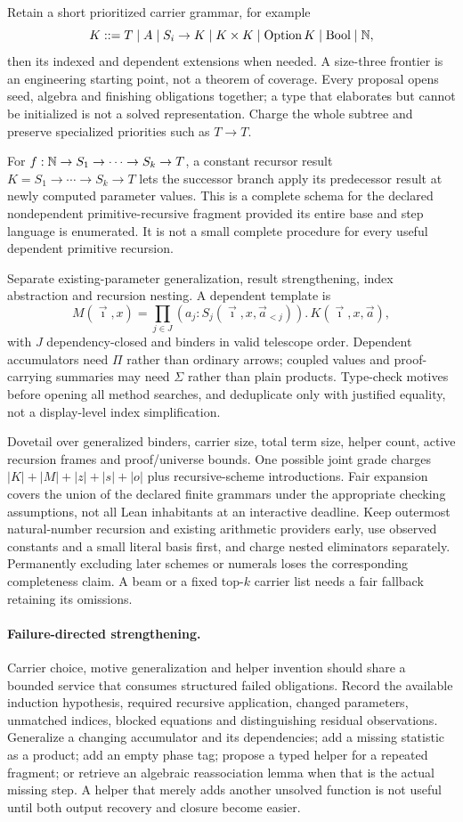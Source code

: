 Retain a short prioritized carrier grammar, for example
\[
 K::=T\mid A\mid S_i\to K\mid K\times K\mid\mathrm{Option}\,K
       \mid\mathrm{Bool}\mid\mathbb{N},
\]
then its indexed and dependent extensions when needed. A size-three frontier
is an engineering starting point, not a theorem of coverage. Every proposal
opens seed, algebra and finishing obligations together; a type that elaborates
but cannot be initialized is not a solved representation. Charge the whole
subtree and preserve specialized priorities such as $T\to T$.

For $f:\mathbb{N}\to S_1\to\cdots\to S_k\to T$, a constant recursor result
$K=S_1\to\cdots\to S_k\to T$ lets the successor branch apply its
predecessor result at newly computed parameter values. This is a complete
schema for the declared nondependent primitive-recursive fragment provided
its entire base and step language is enumerated. It is not a small complete
procedure for every useful dependent primitive recursion.

Separate existing-parameter generalization, result strengthening, index
abstraction and recursion nesting. A dependent template is
\[
 M(\vec\imath,x)=
 \prod_{j\in J}(a_j:S_j(\vec\imath,x,\vec a_{<j})).\,
 K(\vec\imath,x,\vec a),
\]
with $J$ dependency-closed and binders in valid telescope order. Dependent
accumulators need $\Pi$ rather than ordinary arrows; coupled values and
proof-carrying summaries may need $\Sigma$ rather than plain products.
Type-check motives before opening all method searches, and deduplicate only
with justified equality, not a display-level index simplification.

Dovetail over generalized binders, carrier size, total term size, helper
count, active recursion frames and proof/universe bounds. One possible joint
grade charges $|K|+|M|+|z|+|s|+|o|$ plus recursive-scheme introductions.
Fair expansion covers the union of the declared finite grammars under the
appropriate checking assumptions, not all Lean inhabitants at an interactive
deadline. Keep outermost natural-number recursion and existing arithmetic
providers early, use observed constants and a small literal basis first, and
charge nested eliminators separately. Permanently excluding later schemes or
numerals loses the corresponding completeness claim. A beam or a fixed top-$k$
carrier list needs a fair fallback retaining its omissions.

\paragraph{Failure-directed strengthening.}
Carrier choice, motive generalization and helper invention should share a
bounded service that consumes structured failed obligations. Record the
available induction hypothesis, required recursive application, changed
parameters, unmatched indices, blocked equations and distinguishing residual
observations. Generalize a changing accumulator and its dependencies; add a
missing statistic as a product; add an empty phase tag; propose a typed helper
for a repeated fragment; or retrieve an algebraic reassociation lemma when
that is the actual missing step. A helper that merely adds another unsolved
function is not useful until both output recovery and closure become easier.

